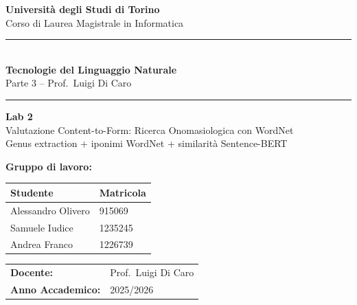 \documentclass[12pt,a4paper]{article}
\newcommand{\HRule}{\rule{\linewidth}{0.5mm}}
\begin{document}
\raggedbottom

\begin{titlepage}
  \centering
  \vspace*{1.5cm}

  {\Large\textbf{Universit\`a degli Studi di Torino}\\[0.3em]
  Corso di Laurea Magistrale in Informatica}

  \vspace{1cm}
  \HRule\\[0.4em]
  {\LARGE\textbf{Tecnologie del Linguaggio Naturale}}\\[0.3em]
  {\large Parte 3 -- Prof.\ Luigi Di Caro}\\[0.2em]
  \HRule

  \vspace{1.2cm}
  {\huge\textbf{Lab 2}}\\[0.5em]
  {\LARGE Valutazione Content-to-Form: Ricerca Onomasiologica con WordNet}\\[0.4em]
  {\large Genus extraction + iponimi WordNet + similarit\`a Sentence-BERT}

  \vspace{2cm}

  {\large\textbf{Gruppo di lavoro:}}\\[0.8em]
  \begin{tabular}{ll}
    \toprule
    \textbf{Studente}    & \textbf{Matricola} \\
    \midrule
    Alessandro Olivero   & 915069  \\
    Samuele Iudice       & 1235245 \\
    Andrea Franco        & 1226739 \\
    \bottomrule
  \end{tabular}

  \vspace{1.5cm}
  \begin{tabular}{ll}
    \textbf{Docente:}          & Prof.\ Luigi Di Caro \\[0.3em]
    \textbf{Anno Accademico:}  & 2025/2026 \\
  \end{tabular}

  \vfill
\end{titlepage}

\tableofcontents
\newpage

\end{document}
